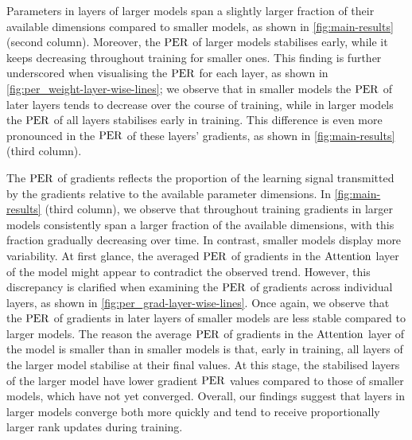 \begin{result} 
\label{result:weight-effective-rank} 
Parameters in layers of larger models span a slightly larger fraction of their available dimensions compared to smaller models, as shown in \cref{fig:main-results} (second column). 
Moreover, the $\mathrm{PER}$ of larger models stabilises early, while it keeps decreasing throughout training for smaller ones. This finding is further underscored when visualising the $\mathrm{PER}$ for each layer, as shown in \cref{fig:per_weight-layer-wise-lines}; we observe that in smaller models the $\mathrm{PER}$ of later layers tends to decrease over the course of training, while in larger models the $\mathrm{PER}$ of all layers stabilises early in training. This difference is even more pronounced in the $\mathrm{PER}$ of these layers' gradients, as shown in \cref{fig:main-results} (third column).
\end{result}

\begin{result}
\label{result}
The $\mathrm{PER}$ of gradients reflects the proportion of the learning signal transmitted by the gradients relative to the available parameter dimensions. In \cref{fig:main-results} (third column), we observe that throughout training gradients in larger models consistently span a larger fraction of the available dimensions, with this fraction gradually decreasing over time. In contrast, smaller models display more variability. At first glance, the averaged $\mathrm{PER}$ of gradients in the $\mathrm{Attention}$ layer of the \twobil model might appear to contradict the observed trend. However, this discrepancy is clarified when examining the $\mathrm{PER}$ of gradients across individual layers, as shown in \cref{fig:per_grad-layer-wise-lines}. Once again, we observe that the $\mathrm{PER}$ of gradients in later layers of smaller models are less stable compared to larger models. The reason the average $\mathrm{PER}$ of gradients in the $\mathrm{Attention}$ layer of the \twobil model is smaller than in smaller models is that, early in training, all layers of the larger model stabilise at their final values. At this stage, the stabilised layers of the larger model have lower gradient $\mathrm{PER}$ values compared to those of smaller models, which have not yet converged. Overall, our findings suggest that layers in larger models converge both more quickly and tend to receive proportionally larger rank updates during training.
\end{result}


